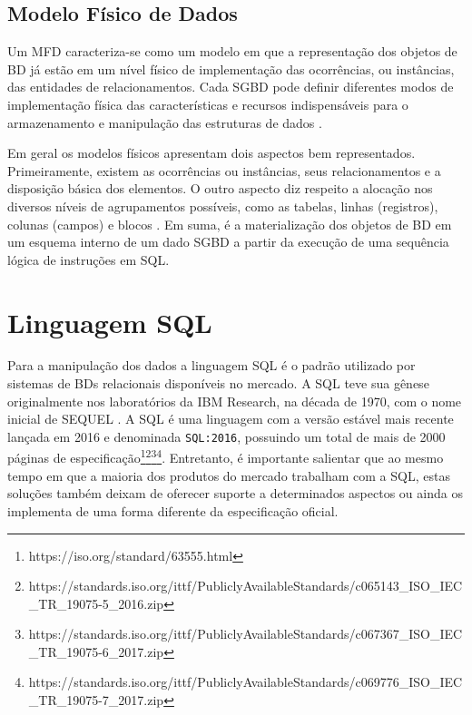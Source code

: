     \subsection{Modelo Físico de Dados} \label{ssec:ModelFisico}

Um \ac{MFD} caracteriza-se como um modelo em que a representação dos objetos de \ac{BD} já estão em um nível físico de implementação das ocorrências, ou instâncias, das entidades de relacionamentos. 
Cada \ac{SGBD} pode definir diferentes modos de implementação física das características e recursos indispensáveis para o armazenamento e manipulação das estruturas de dados \cite{Cougo:2013}.

Em geral os modelos físicos apresentam dois aspectos bem representados. 
Primeiramente, existem as ocorrências ou instâncias, seus relacionamentos e a disposição básica dos elementos. 
O outro aspecto diz respeito a alocação nos diversos níveis de agrupamentos possíveis, como as tabelas, linhas (registros), colunas (campos) e blocos \cite{West:2011}.
Em suma, é a materialização dos objetos de \ac{BD} em um esquema interno de um dado \ac{SGBD} a partir da execução de uma sequência lógica de instruções em \ac{SQL}.

\section{Linguagem SQL} \label{sec:LinguagemSQL}

Para a manipulação dos dados a linguagem \ac{SQL} é o  padrão utilizado por sistemas de \acp{BD} relacionais disponíveis no mercado. 
A \ac{SQL} teve sua gênese originalmente nos laboratórios da IBM Research, na década de 1970, com o nome inicial de SEQUEL \cite{Chamberlin:1974}.
A \ac{SQL} é uma linguagem com a versão estável mais recente lançada em 2016 e denominada \texttt{SQL:2016}, possuindo um total de mais de 2000 páginas de especificação\footnote{https://iso.org/standard/63555.html}\footnote{https://standards.iso.org/ittf/PubliclyAvailableStandards/c065143_ISO_IEC_TR_19075-5_2016.zip}\footnote{https://standards.iso.org/ittf/PubliclyAvailableStandards/c067367_ISO_IEC_TR_19075-6_2017.zip}\footnote{https://standards.iso.org/ittf/PubliclyAvailableStandards/c069776_ISO_IEC_TR_19075-7_2017.zip}. 
Entretanto, é importante salientar que ao mesmo tempo em que a maioria dos produtos do mercado trabalham com a \ac{SQL}, estas soluções também deixam de oferecer suporte a determinados aspectos ou ainda os implementa de uma forma diferente da especificação oficial. 

